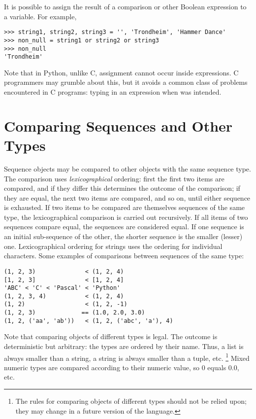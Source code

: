 \documentclass{manual}
\begin{document}
It is possible to assign the result of a comparison or other Boolean
expression to a variable.  For example,

\begin{verbatim}
>>> string1, string2, string3 = '', 'Trondheim', 'Hammer Dance'
>>> non_null = string1 or string2 or string3
>>> non_null
'Trondheim'
\end{verbatim}

Note that in Python, unlike C, assignment cannot occur inside expressions.
C programmers may grumble about this, but it avoids a common class of
problems encountered in C programs: typing \code{=} in an expression when
\code{==} was intended.


\section{Comparing Sequences and Other Types \label{comparing}}

Sequence objects may be compared to other objects with the same
sequence type.  The comparison uses \emph{lexicographical} ordering:
first the first two items are compared, and if they differ this
determines the outcome of the comparison; if they are equal, the next
two items are compared, and so on, until either sequence is exhausted.
If two items to be compared are themselves sequences of the same type,
the lexicographical comparison is carried out recursively.  If all
items of two sequences compare equal, the sequences are considered
equal.  If one sequence is an initial sub-sequence of the other, the
shorter sequence is the smaller (lesser) one.  Lexicographical
ordering for strings uses the \ASCII{} ordering for individual
characters.  Some examples of comparisons between sequences of the
same type:

\begin{verbatim}
(1, 2, 3)              < (1, 2, 4)
[1, 2, 3]              < [1, 2, 4]
'ABC' < 'C' < 'Pascal' < 'Python'
(1, 2, 3, 4)           < (1, 2, 4)
(1, 2)                 < (1, 2, -1)
(1, 2, 3)             == (1.0, 2.0, 3.0)
(1, 2, ('aa', 'ab'))   < (1, 2, ('abc', 'a'), 4)
\end{verbatim}

Note that comparing objects of different types is legal.  The outcome
is deterministic but arbitrary: the types are ordered by their name.
Thus, a list is always smaller than a string, a string is always
smaller than a tuple, etc.  \footnote{
        The rules for comparing objects of different types should
        not be relied upon; they may change in a future version of
        the language.
} Mixed numeric types are compared according to their numeric value, so
0 equals 0.0, etc.
\end{document}
